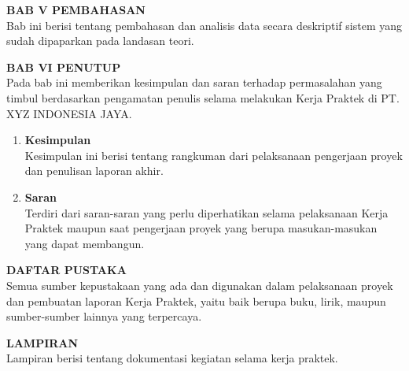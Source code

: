 \vspace{0.5cm}
\noindent \textbf{BAB V PEMBAHASAN} \\
Bab ini berisi tentang pembahasan dan analisis data secara deskriptif sistem yang sudah dipaparkan pada landasan teori.

\vspace{0.5cm}
\noindent \textbf{BAB VI PENUTUP} \\
Pada bab ini memberikan kesimpulan dan saran terhadap permasalahan yang timbul berdasarkan pengamatan penulis selama melakukan Kerja Praktek di PT. XYZ INDONESIA JAYA.
\begin{enumerate}
      \item \textbf{Kesimpulan} \\
            Kesimpulan ini berisi tentang rangkuman dari pelaksanaan pengerjaan proyek dan penulisan laporan akhir.
      \item \textbf{Saran} \\
            Terdiri dari saran-saran yang perlu diperhatikan selama pelaksanaan Kerja Praktek maupun saat pengerjaan proyek yang berupa masukan-masukan yang dapat membangun.
\end{enumerate}

\vspace{0.5cm}
\noindent \textbf{DAFTAR PUSTAKA} \\
Semua sumber kepustakaan yang ada dan digunakan dalam pelaksanaan proyek dan pembuatan laporan Kerja Praktek, yaitu baik berupa buku, lirik, maupun sumber-sumber lainnya yang terpercaya.

\vspace{0.5cm}
\noindent \textbf{LAMPIRAN} \\
Lampiran berisi tentang dokumentasi kegiatan selama kerja praktek.

